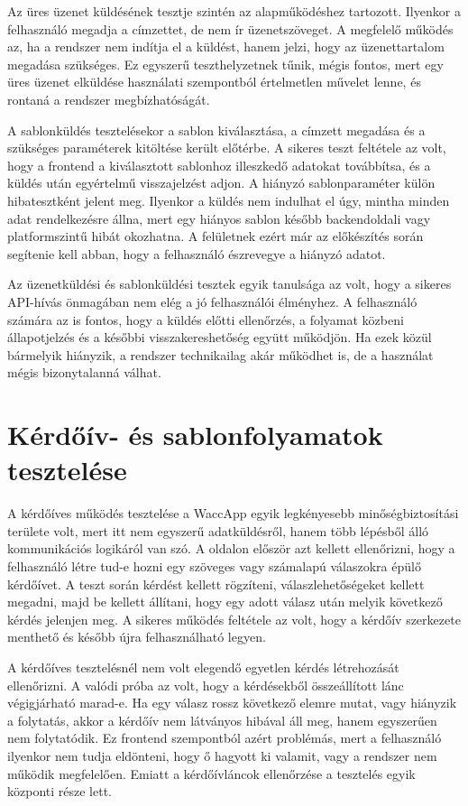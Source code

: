 Az üres üzenet küldésének tesztje szintén az alapműködéshez tartozott. Ilyenkor a felhasználó megadja a címzettet, de nem ír üzenetszöveget. A megfelelő működés az, ha a rendszer nem indítja el a küldést, hanem jelzi, hogy az üzenettartalom megadása szükséges. Ez egyszerű teszthelyzetnek tűnik, mégis fontos, mert egy üres üzenet elküldése használati szempontból értelmetlen művelet lenne, és rontaná a rendszer megbízhatóságát.

A sablonküldés tesztelésekor a sablon kiválasztása, a címzett megadása és a szükséges paraméterek kitöltése került előtérbe. A sikeres teszt feltétele az volt, hogy a frontend a kiválasztott sablonhoz illeszkedő adatokat továbbítsa, és a küldés után egyértelmű visszajelzést adjon. A hiányzó sablonparaméter külön hibatesztként jelent meg. Ilyenkor a küldés nem indulhat el úgy, mintha minden adat rendelkezésre állna, mert egy hiányos sablon később backendoldali vagy platformszintű hibát okozhatna. A felületnek ezért már az előkészítés során segítenie kell abban, hogy a felhasználó észrevegye a hiányzó adatot.

Az üzenetküldési és sablonküldési tesztek egyik tanulsága az volt, hogy a sikeres API-hívás önmagában nem elég a jó felhasználói élményhez. A felhasználó számára az is fontos, hogy a küldés előtti ellenőrzés, a folyamat közbeni állapotjelzés és a későbbi visszakereshetőség együtt működjön. Ha ezek közül bármelyik hiányzik, a rendszer technikailag akár működhet is, de a használat mégis bizonytalanná válhat.

\section{Kérdőív- és sablonfolyamatok tesztelése}

A kérdőíves működés tesztelése a WaccApp egyik legkényesebb minőségbiztosítási területe volt, mert itt nem egyszerű adatküldésről, hanem több lépésből álló kommunikációs logikáról van szó. A  oldalon először azt kellett ellenőrizni, hogy a felhasználó létre tud-e hozni egy szöveges vagy számalapú válaszokra épülő kérdőívet. A teszt során kérdést kellett rögzíteni, válaszlehetőségeket kellett megadni, majd be kellett állítani, hogy egy adott válasz után melyik következő kérdés jelenjen meg. A sikeres működés feltétele az volt, hogy a kérdőív szerkezete menthető és később újra felhasználható legyen.

A kérdőíves tesztelésnél nem volt elegendő egyetlen kérdés létrehozását ellenőrizni. A valódi próba az volt, hogy a kérdésekből összeállított lánc végigjárható marad-e. Ha egy válasz rossz következő elemre mutat, vagy hiányzik a folytatás, akkor a kérdőív nem látványos hibával áll meg, hanem egyszerűen nem folytatódik. Ez frontend szempontból azért problémás, mert a felhasználó ilyenkor nem tudja eldönteni, hogy ő hagyott ki valamit, vagy a rendszer nem működik megfelelően. Emiatt a kérdőívláncok ellenőrzése a tesztelés egyik központi része lett.

